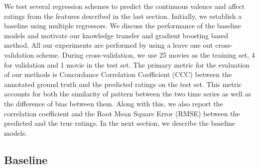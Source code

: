 \documentclass{article}
\begin{document}
We test several regression schemes to predict the continuous valence and affect ratings from the features described in the last section.
Initially, we establish a baseline using multiple regressors.
We discuss the performance of the baseline models and motivate our knowledge transfer and gradient boosting based method.
All our experiments are performed by using a leave one out cross-validation scheme.
During cross-validation, we use 25 movies as the training set, 4 for validation and 1 movie in the test set.
The primary metric for the evaluation of our methods is Concordance Correlation Coefficient (CCC) \cite{} between the annotated ground truth and the predicted ratings on the test set.
This metric accounts for both the similarity of pattern between the two time series as well as the difference of bias between them. 
Along with this, we also report the correlation coefficient and the Root Mean Square Error (RMSE) between the predicted and the true ratings.
In the next section, we describe the baseline models.

\subsection{Baseline}

\end{document}
